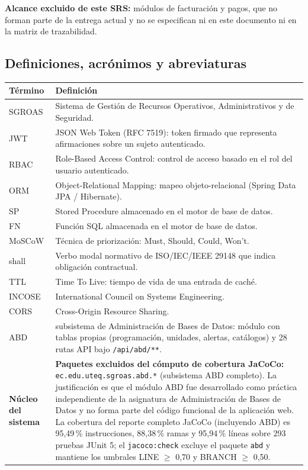\documentclass[12pt,a4paper]{article}
\begin{document}
\textbf{Alcance excluido de este SRS:} módulos de facturación y pagos, que no forman parte de la entrega actual y no se especifican ni en este documento ni en la matriz de trazabilidad.

\subsection{Definiciones, acrónimos y abreviaturas}
\label{sec:definiciones}

\begin{longtable}{@{}p{3.5cm}p{10.5cm}@{}}
\toprule
\textbf{Término} & \textbf{Definición} \\
\midrule
\endhead
SGROAS & Sistema de Gestión de Recursos Operativos, Administrativos y de Seguridad. \\
JWT & JSON Web Token (RFC 7519): token firmado que representa afirmaciones sobre un sujeto autenticado. \\
RBAC & Role-Based Access Control: control de acceso basado en el rol del usuario autenticado. \\
ORM & Object-Relational Mapping: mapeo objeto-relacional (Spring Data JPA / Hibernate). \\
SP & Stored Procedure almacenado en el motor de base de datos. \\
FN & Función SQL almacenada en el motor de base de datos. \\
MoSCoW & Técnica de priorización: Must, Should, Could, Won't. \\
shall & Verbo modal normativo de ISO/IEC/IEEE 29148 que indica obligación contractual. \\
TTL & Time To Live: tiempo de vida de una entrada de caché. \\
INCOSE & International Council on Systems Engineering. \\
CORS & Cross-Origin Resource Sharing. \\
ABD & subsistema de Administración de Bases de Datos: módulo con tablas propias (programación, unidades, alertas, catálogos) y 28 rutas API bajo \texttt{/api/abd/**}. \\
\textbf{Núcleo del sistema} & \textbf{Paquetes excluidos del cómputo de cobertura JaCoCo:} \texttt{ec.edu.uteq.sgroas.abd.*} (subsistema ABD completo). La justificación es que el módulo ABD fue desarrollado como práctica independiente de la asignatura de Administración de Bases de Datos y no forma parte del código funcional de la aplicación web. La cobertura del reporte completo JaCoCo (incluyendo ABD) es 95,49\,\% instrucciones, 88,38\,\% ramas y 95,94\,\% líneas sobre 293 pruebas JUnit 5; el \texttt{jacoco:check} excluye el paquete \texttt{abd} y mantiene los umbrales LINE $\ge$ 0,70 y BRANCH $\ge$ 0,50. \\
\bottomrule
\end{longtable}
\end{document}
